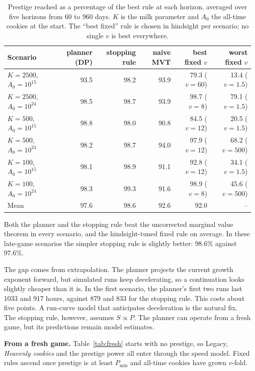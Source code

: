 \documentclass[11pt,a4paper]{article}
\numberwithin{equation}{section}
\theoremstyle{definition}
\theoremstyle{remark}
\newcommand{\proofstep}[1]{\par\addvspace{\medskipamount}\noindent\textbf{#1}\enspace\ignorespaces}
\begin{document}
\begin{table}[t]
\centering
\small
\begin{tabular}{@{}lrrrrr@{}}
\toprule
Scenario & planner (DP) & stopping rule & naive MVT & best fixed $v$ & worst fixed $v$ \\
\midrule
$K=2500$, $A_0=10^{15}$ & 93.5 & 98.2 & 93.9 & 79.3 ($v=60$) & 13.4 ($v=1.5$) \\
$K=2500$, $A_0=10^{24}$ & 98.5 & 98.7 & 93.9 & 98.7 ($v=8$) & 79.1 ($v=1.5$) \\
$K=500$, $A_0=10^{15}$ & 98.8 & 98.0 & 90.8 & 84.5 ($v=12$) & 20.5 ($v=1.5$) \\
$K=500$, $A_0=10^{24}$ & 98.2 & 98.7 & 94.0 & 97.9 ($v=12$) & 68.2 ($v=500$) \\
$K=100$, $A_0=10^{15}$ & 98.1 & 98.9 & 91.1 & 92.8 ($v=12$) & 34.1 ($v=1.5$) \\
$K=100$, $A_0=10^{24}$ & 98.3 & 99.3 & 91.6 & 98.9 ($v=8$) & 45.6 ($v=500$) \\
\midrule
Mean & 97.6 & 98.6 & 92.6 & 92.0 & -- \\
\bottomrule
\end{tabular}
\caption{Prestige reached as a percentage of the best rule at each horizon, averaged over five horizons from 60 to 960 days. $K$ is the milk parameter and $A_0$ the all-time cookies at the start. The ``best fixed'' rule is chosen in hindsight per scenario; no single $v$ is best everywhere.}
\label{tab:ascension}
\end{table}

Both the planner and the stopping rule beat the uncorrected marginal value theorem in every scenario, and the hindsight-tuned fixed rule on average. In these late-game scenarios the simpler stopping rule is slightly better: $98.6\%$ against $97.6\%$.

The gap comes from extrapolation. The planner projects the current growth exponent forward, but simulated runs keep decelerating, so a continuation looks slightly cheaper than it is. In the first scenario, the planner's first two runs last 1033 and 917 hours, against 879 and 833 for the stopping rule. This costs about five points. A run-curve model that anticipates deceleration is the natural fix. The stopping rule, however, assumes $S\propto P$. The planner can operate from a fresh game, but its predictions remain model estimates.

\proofstep{From a fresh game.} Table~\ref{tab:fresh} starts with no prestige, so Legacy, \emph{Heavenly cookies} and the prestige power all enter through the speed model. Fixed rules ascend once prestige is at least $P_{\min}$ and all-time cookies have grown $v$-fold.
\end{document}
